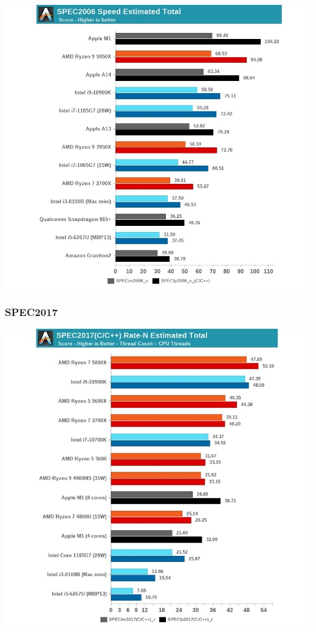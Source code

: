 \documentclass[a4paper]{article}
\begin{document}
\includegraphics[width=\textwidth]{SPEC2006.jpg}

\subsubsection{SPEC2017}

\includegraphics[width=\textwidth]{SPEC2017.jpg}
\end{document}
